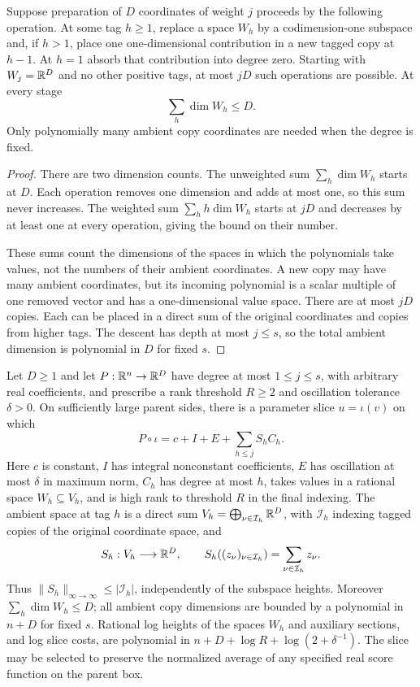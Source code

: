 \begin{lemma}
\label{lifting:rank-potential}
Suppose preparation of $D$ coordinates of weight $j$ proceeds by
the following operation.  At some tag $h\ge1$, replace a space
$W_h$ by a codimension-one subspace and, if $h>1$, place one
one-dimensional contribution in a new tagged copy at $h-1$.
At $h=1$ absorb that contribution into degree zero.  Starting with
$W_j=\mathbb R^D$ and no other positive tags, at most $jD$ such operations
are possible.  At every stage
\[
                         \sum_h\dim W_h\le D.
\]
Only polynomially many ambient copy coordinates are needed when the
degree is fixed.
\end{lemma}

\begin{proof}
There are two dimension counts.  The unweighted sum
$\sum_h\dim W_h$ starts at $D$.  Each operation removes one
dimension and adds at most one, so this sum never increases.
The weighted sum $\sum_h h\dim W_h$ starts at $jD$ and decreases
by at least one at every operation, giving the bound on their number.

These sums count the dimensions of the spaces in which the polynomials
take values, not the numbers of their ambient coordinates.  A new copy
may have many ambient coordinates, but its incoming polynomial is a
scalar multiple of one removed vector and has a one-dimensional value
space.  There are at most $jD$ copies.  Each can be placed in a direct
sum of the original coordinates and copies from higher tags.  The
descent has depth at most $j\le s$, so the total ambient dimension
is polynomial in $D$ for fixed $s$.
\end{proof}

\begin{lemma}
\label{lifting:prepare-layer}
Let $D\ge1$ and let $P:\mathbb R^n\to\mathbb R^D$ have degree at most $1\le j\le s$, with arbitrary
real coefficients, and prescribe a rank threshold $R\ge2$ and
oscillation tolerance $\delta>0$.  On sufficiently large parent
sides, there is a parameter slice $u=\iota(v)$ on which
\[
             P\circ\iota=c+I+E+\sum_{h\le j}S_h C_h.
\]
Here $c$ is constant, $I$ has integral nonconstant coefficients,
$E$ has oscillation at most $\delta$ in maximum norm,
$C_h$ has degree at most $h$, takes values in a rational space
$W_h\subseteq V_h$, and is high rank to threshold $R$ in the final
indexing.  The ambient space at tag $h$ is a direct sum
$V_h=\bigoplus_{\nu\in\mathcal I_h}\mathbb R^D$, with $\mathcal I_h$
indexing tagged copies of the original coordinate space, and
\[
 S_h:V_h\longrightarrow\mathbb R^D,\qquad
 S_h((z_\nu)_{\nu\in\mathcal I_h})
       =\sum_{\nu\in\mathcal I_h}z_\nu.
\]
Thus $\|S_h\|_{\infty\to\infty}\le|\mathcal I_h|$, independently
of the subspace heights.  Moreover
$\sum_h\dim W_h\le D$; all ambient copy dimensions are bounded
by a polynomial in $n+D$ for fixed $s$.  Rational log heights of the
spaces $W_h$ and auxiliary sections, and log slice costs, are polynomial in
$n+D+\log R+\log(2+\delta^{-1})$.
The slice may be selected to preserve the normalized average of any
specified real score function on the parent box.
\end{lemma}

